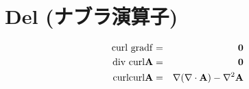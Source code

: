 %
%
%
%
%
\section{Del (ナブラ演算子)}


\begin{eqnarray*}
\rm curl \ \rm grad f       & = & \mathbf{0} \\
\rm div \ \rm curl \mathbf{A} & = & \mathbf{0} \\
\rm curl \rm curl \mathbf{A}    & = & \nabla (\nabla \cdot \mathbf{A}) - \nabla^2 \mathbf{A}
\end{eqnarray*}
